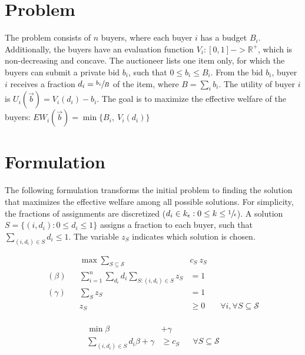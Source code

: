 \section{Problem}

The problem consists of $n$ buyers, where each buyer $i$ has a budget $B_i$. Additionally, the buyers have an evaluation function $V_i : [0,1] -> \mathbb{R}^+$, which is non-decreasing and concave. The auctioneer lists one item only, for which the buyers can submit a private bid $b_i$, such that $0 \le b_i \le B_i$. From the bid $b_i$, buyer $i$ receives a fraction $d_i = \sfrac{b_i}{B}$ of the item, where $B = \sum_i b_i$. The utility of buyer $i$ is $U_i(\vec{b}) = V_i(d_i) - b_i$. The goal is to maximize the effective welfare of the buyers: $EW_i(\vec{b}) = \min\{B_i,\ V_i(d_i)\}$

\section{Formulation}

The following formulation transforms the initial problem to finding the solution that maximizes the effective welfare among all possible solutions. For simplicity, the fractions of assignments are discretized ($d_i \in k_{\epsilon} : 0 \le k \le \sfrac{1}{\epsilon}$). A solution $S = \{(i, d_i) : 0 \le d_i \le 1\}$ assigns a fraction to each buyer, such that $\sum_{(i,d_{i}) \in S} d_{i} \le 1$. The variable $z_S$ indicates which solution is chosen.

\begin{minipage}[t]{0.59\textwidth}
	\begin{align*}
		&& \max  \sum_{S \subseteq \mathcal{S}} &c_{S}\ z_{S} \\
		(\beta) && \sum_{i=1}^{n} \sum_{d_{i}} d_{i} \sum_{S: (i,d_{i}) \in S } z_{S} &= 1 & & \\
		(\gamma) && \sum_{S} z_{S}  &= 1	& & \\
		&& z_{S} &\geq 0 & & \forall i, \forall S \subseteq \mathcal{S}\\
	\end{align*}
\end{minipage}
\begin{minipage}[t]{0.3\textwidth}
	\begin{align*}
		\min \beta &+ \gamma \\
		\sum_{(i,d_{i}) \in S} d_{i} \beta + \gamma &\geq c_{S}  & & \forall S \subseteq \mathcal{S}\\
\end{align*}
\end{minipage}


